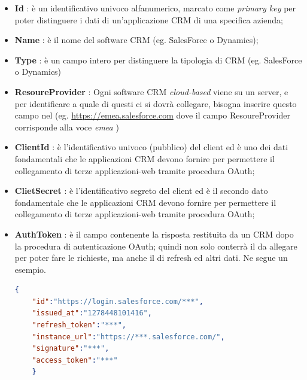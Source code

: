 \begin{itemize}
	\item \textbf{Id} : è un identificativo univoco alfanumerico, marcato come \textit{primary key} per poter distinguere i dati di  un'applicazione CRM di una specifica azienda;
	\item \textbf{Name} : è il nome del software CRM (eg. SalesForce o Dynamics);
	\item \textbf{Type} : è un campo intero per distinguere la tipologia di CRM (eg. SalesForce o Dynamics)  
	\item \textbf{ResoureProvider} :
	Ogni software CRM \textit{cloud-based} viene  su un server, e per identificare a quale di questi ci si dovrà collegare, bisogna inserire questo campo nel  (eg. \url{https://emea.salesforce.com} dove il campo ResoureProvider corrisponde alla voce \textit{emea} )
	\item \textbf{ClientId} : è l’identificativo univoco (pubblico) del client ed è uno dei dati fondamentali che le applicazioni CRM devono fornire per permettere il collegamento di terze applicazioni-web tramite procedura OAuth;
	\item \textbf{ClietSecret} :  è l’identificativo segreto del client ed è il secondo dato fondamentale che le applicazioni CRM devono fornire per permettere il collegamento di terze applicazioni-web tramite procedura OAuth;
	\item \textbf{AuthToken} : è il campo contenente la risposta  restituita da un CRM dopo la procedura di autenticazione OAuth; quindi non solo conterrà il  da allegare per poter fare le richieste, ma anche il  di refresh ed altri dati. Ne segue un esempio.
	
	
	\begin{lstlisting}[language=json,firstnumber=1]
	{
	"id":"https://login.salesforce.com/***",
	"issued_at":"1278448101416",
	"refresh_token":"***",
	"instance_url":"https://***.salesforce.com/",
	"signature":"***",
	"access_token":"***"
	}
	\end{lstlisting}
	
\end{itemize}


